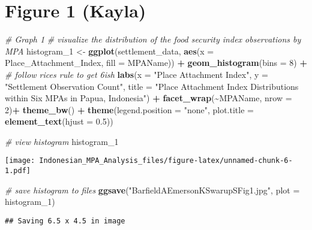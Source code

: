 \documentclass[
]{article}
\newenvironment{Shaded}{\begin{snugshade}}{\end{snugshade}}
\newcommand{\AttributeTok}[1]{\textcolor[rgb]{0.13,0.29,0.53}{#1}}
\newcommand{\CommentTok}[1]{\textcolor[rgb]{0.56,0.35,0.01}{\textit{#1}}}
\newcommand{\DecValTok}[1]{\textcolor[rgb]{0.00,0.00,0.81}{#1}}
\newcommand{\FloatTok}[1]{\textcolor[rgb]{0.00,0.00,0.81}{#1}}
\newcommand{\FunctionTok}[1]{\textcolor[rgb]{0.13,0.29,0.53}{\textbf{#1}}}
\newcommand{\NormalTok}[1]{#1}
\newcommand{\OtherTok}[1]{\textcolor[rgb]{0.56,0.35,0.01}{#1}}
\newcommand{\SpecialCharTok}[1]{\textcolor[rgb]{0.81,0.36,0.00}{\textbf{#1}}}
\newcommand{\StringTok}[1]{\textcolor[rgb]{0.31,0.60,0.02}{#1}}
\begin{document}
\section{Figure 1 (Kayla)}\label{figure-1-kayla}

\begin{Shaded}
\begin{Highlighting}[]
\CommentTok{\# Graph 1}
\CommentTok{\# visualize the distribution of the food security index observations by MPA }
\NormalTok{histogram\_1 }\OtherTok{\textless{}{-}} \FunctionTok{ggplot}\NormalTok{(settlement\_data, }\FunctionTok{aes}\NormalTok{(}\AttributeTok{x =}\NormalTok{ Place\_Attachment\_Index,}
                                           \AttributeTok{fill =}\NormalTok{ MPAName)) }\SpecialCharTok{+}
  \FunctionTok{geom\_histogram}\NormalTok{(}\AttributeTok{bins =} \DecValTok{8}\NormalTok{) }\SpecialCharTok{+}  \CommentTok{\# follow rice\textquotesingle{}s rule to get 6ish}
  \FunctionTok{labs}\NormalTok{(}\AttributeTok{x =} \StringTok{"Place Attachment Index"}\NormalTok{, }
       \AttributeTok{y =} \StringTok{"Settlement Observation Count"}\NormalTok{,}
       \AttributeTok{title =} \StringTok{"Place Attachment Index Distributions within Six MPAs in Papua, Indonesia"}\NormalTok{) }\SpecialCharTok{+}
  \FunctionTok{facet\_wrap}\NormalTok{(}\SpecialCharTok{\textasciitilde{}}\NormalTok{MPAName, }\AttributeTok{nrow =} \DecValTok{2}\NormalTok{)}\SpecialCharTok{+}
  \FunctionTok{theme\_bw}\NormalTok{() }\SpecialCharTok{+}
  \FunctionTok{theme}\NormalTok{(}\AttributeTok{legend.position =} \StringTok{"none"}\NormalTok{,}
        \AttributeTok{plot.title =} \FunctionTok{element\_text}\NormalTok{(}\AttributeTok{hjust =} \FloatTok{0.5}\NormalTok{)) }

\CommentTok{\# view histogram }
\NormalTok{histogram\_1}
\end{Highlighting}
\end{Shaded}

\texttt{[image: Indonesian\_MPA\_Analysis\_files/figure-latex/unnamed-chunk-6-1.pdf]}

\begin{Shaded}
\begin{Highlighting}[]
\CommentTok{\# save histogram to files }
\FunctionTok{ggsave}\NormalTok{(}\StringTok{"BarfieldAEmersonKSwarupSFig1.jpg"}\NormalTok{, }\AttributeTok{plot =}\NormalTok{ histogram\_1)}
\end{Highlighting}
\end{Shaded}

\begin{verbatim}
## Saving 6.5 x 4.5 in image
\end{verbatim}
\end{document}
